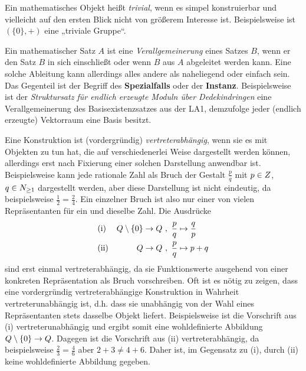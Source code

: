 \begin{description}[labelindent=0pt, leftmargin=0pt]
    Ein mathematisches Objekt heißt \emph{trivial}, wenn es simpel konstruierbar und vielleicht auf den ersten Blick nicht von größerem Interesse ist. Beispielsweise ist $(\{0\},+)$ eine „triviale Gruppe“.

    \item[Verallgemeinerung:] Ein mathematischer Satz $A$ ist eine \emph{Verallgemeinerung} eines Satzes $B$, wenn er den Satz $B$ in sich einschließt oder wenn $B$ aus $A$ abgeleitet werden kann. Eine solche Ableitung kann allerdings alles andere als naheliegend oder einfach sein. Das Gegenteil ist der Begriff des \textbf{Spezialfalls} oder der \textbf{Instanz}. Beispielsweise ist der \emph{Struktursatz für endlich erzeugte Moduln über Dedekindringen} eine Verallgemeinerung des Basisexistenzsatzes aus der LA1, demzufolge jeder (endlich erzeugte) Vektorraum eine Basis besitzt.

    \item[Vertreterabhängig:]  Eine Konstruktion ist (vordergründig) \emph{vertreterabhängig}, wenn sie es mit Objekten zu tun hat, die auf verschiedenerlei Weise dargestellt werden können, allerdings erst nach Fixierung einer solchen Darstellung anwendbar ist. Beispielsweise kann jede rationale Zahl als Bruch der Gestalt $\frac{p}{q}$ mit $p\in \relax Z$, $q\in \relax N_{\ge 1}$ dargestellt werden, aber diese Darstellung ist nicht eindeutig, da beispielsweise $\frac{1}{2}=\frac{2}{4}$. Ein einzelner Bruch ist also nur einer von vielen Repräsentanten für ein und dieselbe Zahl. Die Ausdrücke
    \begin{align*}
        &\text{(i)} & \Q\setminus \{0\} \to \Q \ & ,\ \frac{p}{q} \mapsto \frac{q}{p} \\
        &\text{(ii)} & \Q \to \Q \ & ,\ \frac{p}{q} \mapsto p+q
    \end{align*}
    sind erst einmal vertreterabhängig, da sie Funktionswerte ausgehend von einer konkreten Repräsentation als Bruch vorschreiben. Oft ist es nötig zu zeigen, dass eine vordergründig vertreterabhängige Konstruktion in Wahrheit vertreterunabhängig ist, d.h. dass sie unabhängig von der Wahl eines Repräsentanten stets dasselbe Objekt liefert. Beispielsweise ist die Vorschrift aus (i) vertreterunabhängig und ergibt somit eine wohldefinierte Abbildung $\relax Q\setminus \{0\}\to \relax Q$. Dagegen ist die Vorschrift aus (ii) vertreterabhängig, da beispielsweise $\frac{2}{3}=\frac{4}{6}$ aber $2+3\neq 4+6$. Daher ist, im Gegensatz zu (i), durch (ii) keine wohldefinierte Abbildung gegeben.


\end{description}
